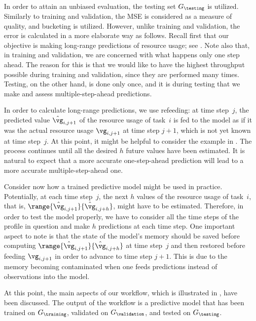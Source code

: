 In order to attain an unbiased evaluation, the testing set $G_\testing$ is
utilized. Similarly to training and validation, the \ac{MSE} is considered as a
measure of quality, and bucketing is utilized. However, unlike training and
validation, the error is calculated in a more elaborate way as follows. Recall
first that our objective is making long-range predictions of resource usage; see
. Note also that, in training and validation, we are
concerned with what happens only one step ahead. The reason for this is that we
would like to have the highest throughput possible during training and
validation, since they are performed many times. Testing, on the other hand, is
done only once, and it is during testing that we make and assess
multiple-step-ahead predictions.

In order to calculate long-range predictions, we use refeeding: at time
step~$j$, the predicted value $\hat{\vg}_{i, j + 1}$ of the resource usage of
task~$i$ is fed to the model as if it was the actual resource usage $\vg_{i, j +
1}$ at time step $j + 1$, which is not yet known at time step~$j$. At this
point, it might be helpful to consider the example in .
The process continues until all the desired $h$ future values have been
estimated. It is natural to expect that a more accurate one-step-ahead
prediction will lead to a more accurate multiple-step-ahead one.

Consider now how a trained predictive model might be used in practice.
Potentially, at each time step~$j$, the next $h$ values of the resource usage of
task~$i$, that is, $\range{\hat{\vg}_{i, j + 1}}{\hat{\vg}_{i, j + h}}$, might
have to be estimated. Therefore, in order to test the model properly, we have to
consider all the time steps of the profile in question and make $h$ predictions
at each time step. One important aspect to note is that the state of the model's
memory should be saved before computing $\range{\hat{\vg}_{i, j +
1}}{\hat{\vg}_{i, j + h}}$ at time step~$j$ and then restored before feeding
$\vg_{i, j + 1}$ in order to advance to time step $j + 1$. This is due to the
memory becoming contaminated when one feeds predictions instead of observations
into the model.

At this point, the main aspects of our workflow, which is illustrated in
, have been discussed. The output of the workflow is a
predictive model that has been trained on $G_\training$, validated on
$G_\validation$, and tested on $G_\testing$.
